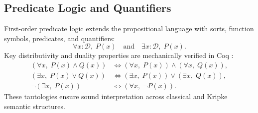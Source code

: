 \subsection{Predicate Logic and Quantifiers}
\label{subsec:pred_logic}

First-order predicate logic extends the propositional language with sorts, function symbols, predicates, and quantifiers:
\begin{equation}
\label{eq:quantifiers}
\forall x \colon \mathcal{D},\; P(x) \quad\text{and}\quad \exists x \colon \mathcal{D},\; P(x).
\end{equation}
Key distributivity and duality properties are mechanically verified in Coq \cite{krupski2019coq}:
\begin{align}
(\forall x,\; P(x) \land Q(x)) &\iff (\forall x,\; P(x)) \land (\forall x,\; Q(x)), \\
(\exists x,\; P(x) \lor Q(x))  &\iff (\exists x,\; P(x)) \lor (\exists x,\; Q(x)), \\
\lnot (\exists x,\; P(x))       &\iff (\forall x,\; \lnot P(x)).
\end{align}
These tautologies ensure sound interpretation across classical and Kripke semantic structures.
